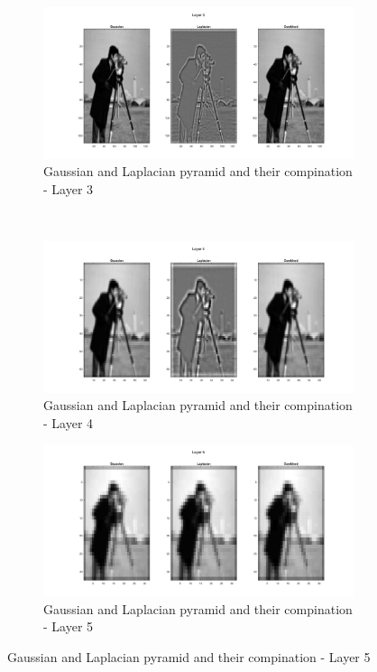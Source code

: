 \documentclass{article}
\begin{document}
\begin{figure}[h!]
		\begin{subfigure}[t]{0.5\textwidth}
			\centering
			\includegraphics[width=\linewidth]{./output_images/layer_3.jpg}
			\caption{Gaussian and Laplacian pyramid and their compination - Layer 3}
		\end{subfigure}%
		~
		\begin{subfigure}[t]{0.5\textwidth}
			\centering
			\includegraphics[width=\linewidth]{./output_images/layer_4.jpg}
			\caption{Gaussian and Laplacian pyramid and their compination - Layer 4}
		\end{subfigure}%
		
		\begin{subfigure}[t]{0.5\textwidth}
			\centering
			\includegraphics[width=\linewidth]{./output_images/layer_5.jpg}
			\caption{Gaussian and Laplacian pyramid and their compination - Layer 5}
		\end{subfigure}		
	\end{figure}
\end{document}
